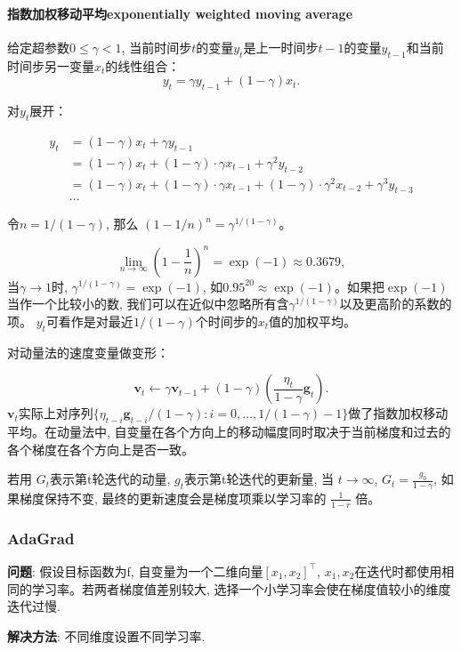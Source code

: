 \documentclass[a4paper]{article}
\begin{document}
 \paragraph{指数加权移动平均exponentially weighted moving average}
 给定超参数$0 \leq \gamma < 1$, 当前时间步$t$的变量$y_t$是上一时间步$t-1$的变量$y_{t-1}$和当前时间步另一变量$x_t$的线性组合：
 $$y_t = \gamma y_{t-1} + (1-\gamma) x_t.$$

对$y_t$展开：

 $$
 \begin{aligned}
 y_t  &= (1-\gamma) x_t + \gamma y_{t-1}\\
          &= (1-\gamma)x_t + (1-\gamma) \cdot \gamma x_{t-1} + \gamma^2y_{t-2}\\
          &= (1-\gamma)x_t + (1-\gamma) \cdot \gamma x_{t-1} + (1-\gamma) \cdot \gamma^2x_{t-2} + \gamma^3y_{t-3}\\
          &\ldots
 \end{aligned}
 $$
 
 令$n = 1/(1-\gamma)$, 那么 $\left(1-1/n\right)^n = \gamma^{1/(1-\gamma)}$。
 
 $$ \lim_{n \rightarrow \infty}  \left(1-\frac{1}{n}\right)^n = \exp(-1) \approx 0.3679, $$
 当$\gamma \rightarrow 1$时, $\gamma^{1/(1-\gamma)}=\exp(-1)$, 如$0.95^{20} \approx \exp(-1)$。如果把$\exp(-1)$当作一个比较小的数, 我们可以在近似中忽略所有含$\gamma^{1/(1-\gamma)}$以及更高阶的系数的项。 
 $y_t$可看作是对最近$1/(1-\gamma)$个时间步的$x_t$值的加权平均。


对动量法的速度变量做变形：

 $$\boldsymbol{v}_t \leftarrow \gamma \boldsymbol{v}_{t-1} + (1 - \gamma) \left(\frac{\eta_t}{1 - \gamma} \boldsymbol{g}_t\right). $$
$\boldsymbol{v}_t$实际上对序列$\{\eta_{t-i}\boldsymbol{g}_{t-i} /(1-\gamma):i=0, \ldots, 1/(1-\gamma)-1\}$做了指数加权移动平均。在动量法中, 自变量在各个方向上的移动幅度同时取决于当前梯度和过去的各个梯度在各个方向上是否一致。

若用 $G_t$表示第t轮迭代的动量,  $g_t$表示第t轮迭代的更新量, 当 $t \to \infty $,  $G_t= \frac{g_0}{1-\gamma} $, 如果梯度保持不变, 最终的更新速度会是梯度项乘以学习率的 $\frac{1}{1-r}$ 倍。

\subsubsection{AdaGrad}
\textbf{问题}: 假设目标函数为f, ⾃变量为一个二维向量$[x_1,  x_2]^\top$, $x_1, x_2$在迭代时都使用相同的学习率。若两者梯度值差别较大, 选择一个小学习率会使在梯度值较小的维度迭代过慢. \\
\par \textbf{解决方法}: 不同维度设置不同学习率. 
\end{document}
